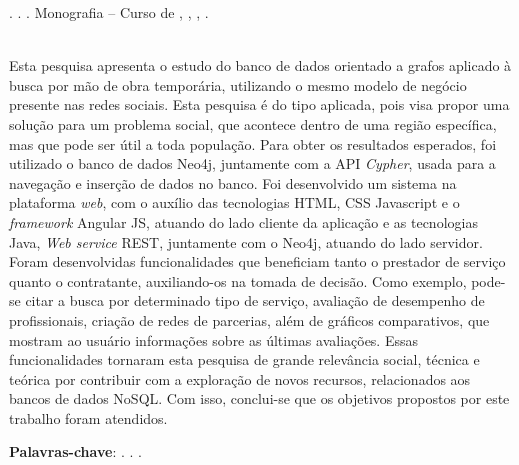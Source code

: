 
\begin{OnehalfSpacing} 

\noindent \imprimirAutorCitacaoMaiuscula. {\bfseries\imprimirtitulo}. {\imprimirdata}.  Monografia -- Curso de {\MakeUppercase\imprimircurso}, {\imprimirinstituicao}, {\imprimirlocal}, {\imprimirdata}.

\vspace{\onelineskip}
\vspace{\onelineskip}
\vspace{\onelineskip}
\vspace{\onelineskip}

\begin{resumo}
~\\
\noindent Esta pesquisa apresenta o estudo do banco de dados orientado a grafos aplicado à busca por mão de obra temporária, utilizando o mesmo modelo de negócio presente nas redes sociais. Esta pesquisa é do tipo aplicada, pois visa propor uma solução para um problema social, que acontece dentro de uma região específica, mas que pode ser útil a toda população. Para obter os resultados esperados, foi utilizado o banco de dados Neo4j, juntamente com a API \textit{Cypher}, usada para a navegação e inserção de dados no banco. Foi desenvolvido um sistema na plataforma \textit{web}, com o auxílio das tecnologias HTML, CSS Javascript e o \textit{framework} Angular JS, atuando do lado cliente da aplicação e as tecnologias Java, \textit{Web service} REST, juntamente com o Neo4j, atuando do lado servidor. Foram desenvolvidas funcionalidades que beneficiam tanto o prestador de serviço quanto o contratante, auxiliando-os na tomada de decisão. Como exemplo, pode-se citar a busca por determinado tipo de serviço, avaliação de desempenho de profissionais, criação de redes de parcerias, além de gráficos comparativos, que mostram ao usuário informações sobre as últimas avaliações. Essas funcionalidades tornaram esta pesquisa de grande relevância social, técnica e teórica por contribuir com a exploração de novos recursos, relacionados aos bancos de dados NoSQL. Com isso, conclui-se que os objetivos propostos por este trabalho foram atendidos.


\vspace{\onelineskip}
\vspace*{\fill}
\noindent \textbf{Palavras-chave}: \imprimirPalavraChaveUm. \imprimirPalavraChaveDois. \imprimirPalavraChaveTres.
\vspace{\onelineskip}
\end{resumo}

\end{OnehalfSpacing}

